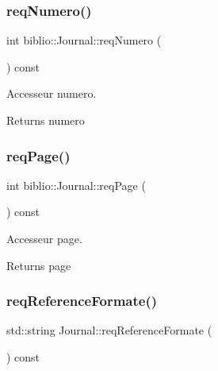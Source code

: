 \subsubsection{\texorpdfstring{req\+Numero()}{reqNumero()}}
{\footnotesize\ttfamily int biblio\+::\+Journal\+::req\+Numero (\begin{DoxyParamCaption}{ }\end{DoxyParamCaption}) const\hspace{0.3cm}{\ttfamily [inline]}}



Accesseur numero. 

\begin{DoxyReturn}{Returns}
numero 
\end{DoxyReturn}
\mbox{\label{classbiblio_1_1Journal_a4851c5abea5315d7c666b7ce11af8794}} 
\subsubsection{\texorpdfstring{req\+Page()}{reqPage()}}
{\footnotesize\ttfamily int biblio\+::\+Journal\+::req\+Page (\begin{DoxyParamCaption}{ }\end{DoxyParamCaption}) const\hspace{0.3cm}{\ttfamily [inline]}}



Accesseur page. 

\begin{DoxyReturn}{Returns}
page 
\end{DoxyReturn}
\mbox{\label{classbiblio_1_1Journal_a5234b1ab18da0a93d14d2319d6ccb8b2}} 
\subsubsection{\texorpdfstring{req\+Reference\+Formate()}{reqReferenceFormate()}}
{\footnotesize\ttfamily std\+::string Journal\+::req\+Reference\+Formate (\begin{DoxyParamCaption}{ }\end{DoxyParamCaption}) const\hspace{0.3cm}{\ttfamily [virtual]}}



